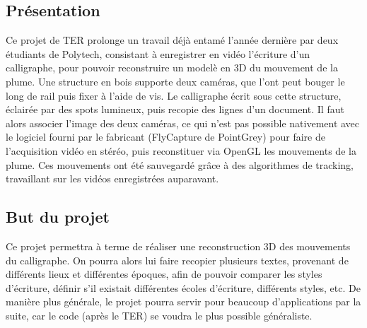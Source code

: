 \subsection{Présentation}

Ce projet de TER prolonge un travail déjà entamé l'année dernière par deux étudiants de Polytech, consistant à enregistrer en vidéo l'écriture d'un calligraphe, pour pouvoir reconstruire un modelè en 3D du mouvement de la plume. Une structure en bois supporte deux caméras, que l'ont peut bouger le long de rail puis fixer à l'aide de vis. Le calligraphe écrit sous cette structure, éclairée par des spots lumineux, puis recopie des lignes d'un document. Il faut alors associer l'image des deux caméras, ce qui n'est pas possible nativement avec le logiciel fourni par le fabricant (FlyCapture de PointGrey) pour faire de l'acquisition vidéo en stéréo, puis reconstituer via OpenGL les mouvements de la plume. Ces mouvements ont été sauvegardé grâce à des algorithmes de tracking, travaillant sur les vidéos enregistrées auparavant.

\subsection{But du projet}

Ce projet permettra à terme de réaliser une reconstruction 3D des mouvements du calligraphe. On pourra alors lui faire recopier plusieurs textes, provenant de différents lieux et différentes époques, afin de pouvoir comparer les styles d'écriture, définir s'il existait différentes écoles d'écriture, différents styles, etc. De manière plus générale, le projet pourra servir pour beaucoup d'applications par la suite, car le code (après le TER) se voudra le plus possible généraliste.